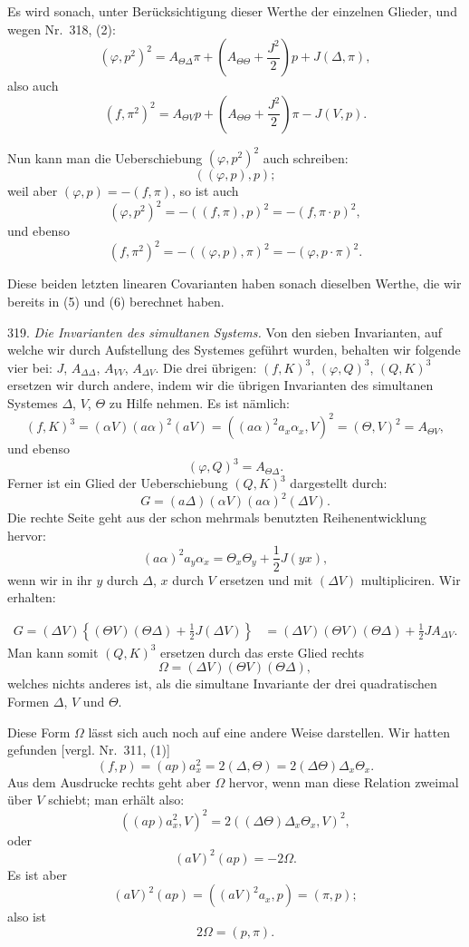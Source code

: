 \documentclass[11pt]{article}
\providecommand{\weberpage}[1]{}
\providecommand{\weq}[2]{\begin{equation}\tag{#1}#2\end{equation}}
\let\Delta\varDelta
\let\Theta\varTheta
\let\Omega\varOmega
\begin{document}
Es wird sonach, unter Berücksichtigung dieser Werthe der einzelnen Glieder,
und wegen Nr.\ 318, (2):
\weq{5}{(\varphi, p^2)^2 = A_{\Theta\Delta}\pi + \left(A_{\Theta\Theta} + \frac{J^2}{2}\right)p + J(\Delta,\pi),}
also auch
\weq{6}{(f, \pi^2)^2 = A_{\Theta V}p + \left(A_{\Theta\Theta} + \frac{J^2}{2}\right)\pi - J(V,p).}

Nun kann man die Ueberschiebung $(\varphi, p^2)^2$ auch schreiben:
\[
((\varphi, p), p);
\]
weil aber $(\varphi, p) = -(f, \pi)$, so ist auch
\[
(\varphi, p^2)^2 = -((f, \pi), p)^2 = -(f, \pi\cdot p)^2,
\]
und ebenso
\[
(f, \pi^2)^2 = -((\varphi, p), \pi)^2 = -(\varphi, p\cdot\pi)^2.
\]

Diese beiden letzten linearen Covarianten haben sonach dieselben Werthe,
die wir bereits in (5) und (6) berechnet haben.

319. \textit{Die Invarianten des simultanen Systems.} Von den sieben
Invarianten, auf welche wir durch Aufstellung des Systemes geführt wurden,
behalten wir folgende vier bei: $J$, $A_{\Delta\Delta}$, $A_{VV}$,
$A_{\Delta V}$. Die drei übrigen: $(f, K)^3$, $(\varphi, Q)^3$, $(Q, K)^3$
ersetzen wir durch andere, indem wir die übrigen Invarianten des
simultanen Systemes $\Delta$, $V$, $\Theta$ zu Hilfe nehmen. Es ist
nämlich:
\weq{1}{(f, K)^3 = (\alpha V)(a\alpha)^2(aV) = ((a\alpha)^2a_x\alpha_x, V)^2 = (\Theta, V)^2 = A_{\Theta V},}
und ebenso
\[
(\varphi, Q)^3 = A_{\Theta\Delta}.
\]
Ferner ist ein Glied der Ueberschiebung $(Q, K)^3$ dargestellt durch:
\[
G = (a\Delta)(\alpha V)(a\alpha)^2(\Delta V).
\]
Die rechte Seite geht aus der schon mehrmals benutzten
Reihenentwicklung hervor:
\[
(a\alpha)^2a_y\alpha_x = \Theta_x\Theta_y + \frac{1}{2}J(yx),
\]
wenn wir in ihr $y$ durch $\Delta$, $x$ durch $V$ ersetzen und mit
$(\Delta V)$ multipliciren. Wir erhalten:


\weberpage{343}
\[
\begin{aligned}
G = (\Delta V)\left\{(\Theta V)(\Theta\Delta) + \frac{1}{2}J(\Delta V)\right\}
&= (\Delta V)(\Theta V)(\Theta\Delta) + \frac{1}{2}J A_{\Delta V}.
\end{aligned}
\]
Man kann somit $(Q, K)^3$ ersetzen durch das erste Glied rechts
\weq{2}{\Omega = (\Delta V)(\Theta V)(\Theta\Delta),}
welches nichts anderes ist, als die simultane Invariante der drei
quadratischen Formen $\Delta$, $V$ und $\Theta$.

Diese Form $\Omega$ lässt sich auch noch auf eine andere Weise
darstellen. Wir hatten gefunden [vergl. Nr.\ 311, (1)]
\[
(f, p) = (ap)a_x^2 = 2(\Delta, \Theta) = 2(\Delta\Theta)\Delta_x\Theta_x.
\]
Aus dem Ausdrucke rechts geht aber $\Omega$ hervor, wenn man diese
Relation zweimal über $V$ schiebt; man erhält also:
\[
((ap)a_x^2, V)^2 = 2((\Delta\Theta)\Delta_x\Theta_x, V)^2,
\]
oder
\[
(aV)^2(ap) = -2\Omega.
\]
Es ist aber
\[
(aV)^2(ap) = ((aV)^2a_x, p) = (\pi, p);
\]
also ist
\[
2\Omega = (p, \pi).
\]
\end{document}

